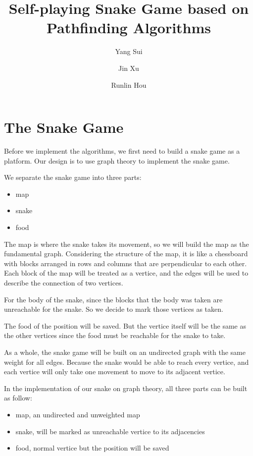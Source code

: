 \documentclass[12pt]{article}
\begin{document}
\title{\textbf{Self-playing Snake Game based on Pathfinding Algorithms}}
\author{Yang Sui \and Jin Xu \and Runlin Hou}

\maketitle

\section{The Snake Game}
Before we implement the algorithms, we first need to build a snake game as a platform. Our design is to use graph theory to implement the snake game. 

We separate the snake game into three parts:
\begin{itemize}
    \item map
    \item snake
    \item food
\end{itemize}

The map is where the snake takes its movement, so we will build the map as the fundamental graph. Considering the structure of the map, it is like a  chessboard with blocks arranged in rows and columns that are perpendicular to each other. Each block of the map will be treated as a vertice, and the edges will be used to describe the connection of two vertices. 

For the body of the snake, since the blocks that the body was taken are unreachable for the snake. So we decide to mark those vertices as taken.

The food of the position will be saved. But the vertice itself will be the same as the other vertices since the food must be reachable for the snake to take.

As a whole, the snake game will be built on an undirected graph with the same weight for all edges. Because the snake would be able to reach every vertice, and each vertice will only take one movement to move to its adjacent vertice.

In the implementation of our snake on graph theory, all three parts can be built as follow:
\begin{itemize}
    \item map, an undirected and unweighted map
    \item snake, will be marked as unreachable vertice to its adjacencies
    \item food, normal vertice but the position will be saved
\end{itemize}
\end{document}
